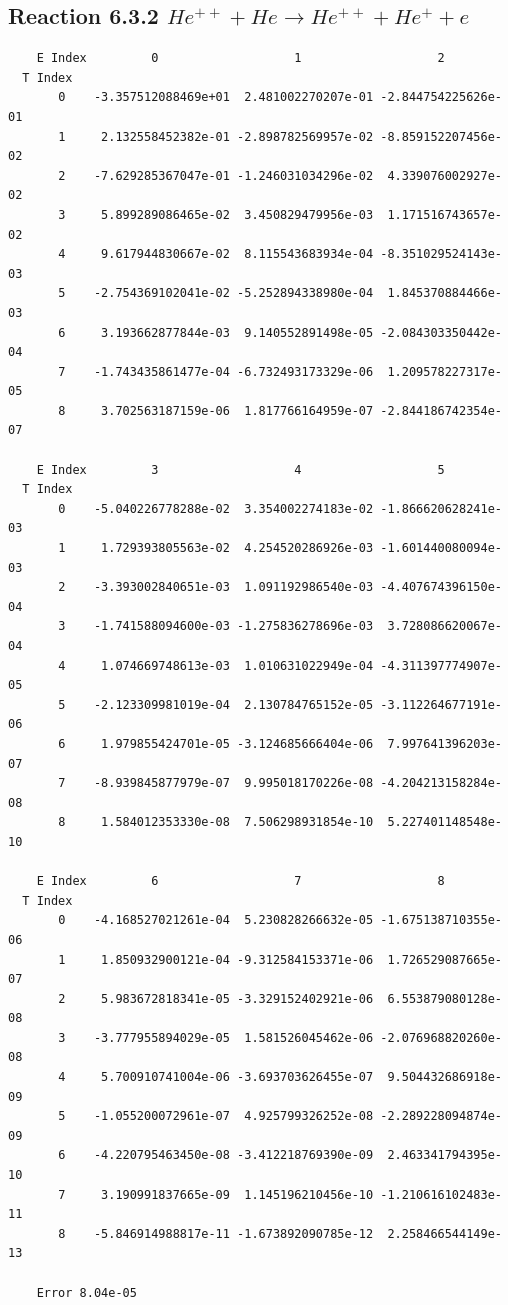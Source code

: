 \documentclass[12pt,dvipdfmx]{article}
\begin{document}
\newpage
\subsection{
Reaction 6.3.2 $   He^{++} + He \rightarrow He^{++} + He^+ + e$}

\begin{small}\begin{verbatim}
    E Index         0                   1                   2
  T Index
       0    -3.357512088469e+01  2.481002270207e-01 -2.844754225626e-01
       1     2.132558452382e-01 -2.898782569957e-02 -8.859152207456e-02
       2    -7.629285367047e-01 -1.246031034296e-02  4.339076002927e-02
       3     5.899289086465e-02  3.450829479956e-03  1.171516743657e-02
       4     9.617944830667e-02  8.115543683934e-04 -8.351029524143e-03
       5    -2.754369102041e-02 -5.252894338980e-04  1.845370884466e-03
       6     3.193662877844e-03  9.140552891498e-05 -2.084303350442e-04
       7    -1.743435861477e-04 -6.732493173329e-06  1.209578227317e-05
       8     3.702563187159e-06  1.817766164959e-07 -2.844186742354e-07

    E Index         3                   4                   5
  T Index
       0    -5.040226778288e-02  3.354002274183e-02 -1.866620628241e-03
       1     1.729393805563e-02  4.254520286926e-03 -1.601440080094e-03
       2    -3.393002840651e-03  1.091192986540e-03 -4.407674396150e-04
       3    -1.741588094600e-03 -1.275836278696e-03  3.728086620067e-04
       4     1.074669748613e-03  1.010631022949e-04 -4.311397774907e-05
       5    -2.123309981019e-04  2.130784765152e-05 -3.112264677191e-06
       6     1.979855424701e-05 -3.124685666404e-06  7.997641396203e-07
       7    -8.939845877979e-07  9.995018170226e-08 -4.204213158284e-08
       8     1.584012353330e-08  7.506298931854e-10  5.227401148548e-10

    E Index         6                   7                   8
  T Index
       0    -4.168527021261e-04  5.230828266632e-05 -1.675138710355e-06
       1     1.850932900121e-04 -9.312584153371e-06  1.726529087665e-07
       2     5.983672818341e-05 -3.329152402921e-06  6.553879080128e-08
       3    -3.777955894029e-05  1.581526045462e-06 -2.076968820260e-08
       4     5.700910741004e-06 -3.693703626455e-07  9.504432686918e-09
       5    -1.055200072961e-07  4.925799326252e-08 -2.289228094874e-09
       6    -4.220795463450e-08 -3.412218769390e-09  2.463341794395e-10
       7     3.190991837665e-09  1.145196210456e-10 -1.210616102483e-11
       8    -5.846914988817e-11 -1.673892090785e-12  2.258466544149e-13

    Error 8.04e-05
\end{verbatim}\end{small}
\end{document}
